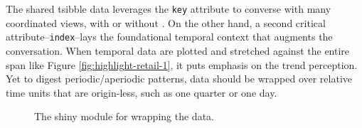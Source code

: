 The shared tsibble data leverages the \texttt{key} attribute to converse
with many coordinated views, with or without . On the
other hand, a second critical attribute--\texttt{index}--lays the
foundational temporal context that augments the conversation. When
temporal data are plotted and stretched against the entire span like
Figure \ref{fig:highlight-retail-1}, it puts emphasis on the trend
perception. Yet to digest periodic/aperiodic patterns, data should be
wrapped over relative time units that are origin-less, such as one
quarter or one day.

\begin{Schunk}
\begin{figure}

{\centering {}\newline{}\newline{}

}

\caption[The shiny module for wrapping the  data]{The shiny module for wrapping the  data.}\label{fig:wrap-ped}
\end{figure}
\end{Schunk}

